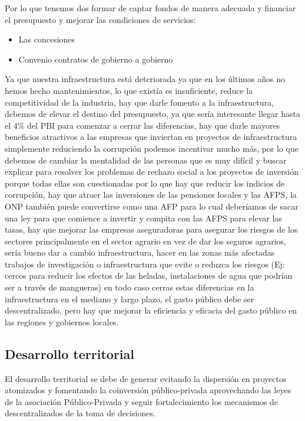 \documentclass[
  a4paper,
]{article}
\providecommand{\tightlist}{%
  \setlength{\itemsep}{0pt}\setlength{\parskip}{0pt}}\usepackage{longtable,booktabs,array}
\begin{document}
Por lo que tenemos dos formar de captar fondos de manera adecuada y
financiar el presupuesto y mejorar las condiciones de servicios:

\begin{itemize}
\tightlist
\item
  Las concesiones
\item
  Convenio contratos de gobierno a gobierno
\end{itemize}

Ya que nuestra infraestructura está deteriorada ya que en los últimos
años no hemos hecho mantenimientos, lo que existía es insuficiente,
reduce la competitividad de la industria, hay que darle fomento a la
infraestructura, debemos de elevar el destino del presupuesto, ya que
sería interesante llegar hasta el 4\% del PBI para comenzar a cerrar las
diferencias, hay que darle mayores beneficios atractivos a las empresas
que inviertan en proyectos de infraestructura simplemente reduciendo la
corrupción podemos incentivar mucho más, por lo que debemos de cambiar
la mentalidad de las personas que es muy difícil y buscar explicar para
resolver los problemas de rechazo social a los proyectos de inversión
porque todas ellas son cuestionadas por lo que hay que reducir los
indicios de corrupción, hay que atraer las inversiones de las pensiones
locales y las AFPS, la ONP también puede convertirse como una AFP para
lo cual deberíamos de sacar una ley para que comience a invertir y
compita con las AFPS para elevar las tasas, hay que mejorar las empresas
aseguradoras para asegurar los riesgos de los sectores principalmente en
el sector agrario en vez de dar los seguros agrarios, sería bueno dar a
cambio infraestructura, hacer en las zonas más afectadas trabajos de
investigación o infraestructura que evite o reduzca los riesgos (Ej:
cercos para reducir los efectos de las heladas, instalaciones de agua
que podrían ser a través de mangueras) en todo caso cerras estas
diferencias en la infraestructura en el mediano y largo plazo, el gasto
público debe ser descentralizado, pero hay que mejorar la eficiencia y
eficacia del gasto público en las regiones y gobiernos locales.

\subsection{Desarrollo territorial}\label{desarrollo-territorial}

El desarrollo territorial se debe de generar evitando la dispersión en
proyectos atomizados y fomentando la coinversión público-privada
aprovechando las leyes de la asociación Público-Privada y seguir
fortalecimiento los mecanismos de descentralizados de la toma de
decisiones.
\end{document}
